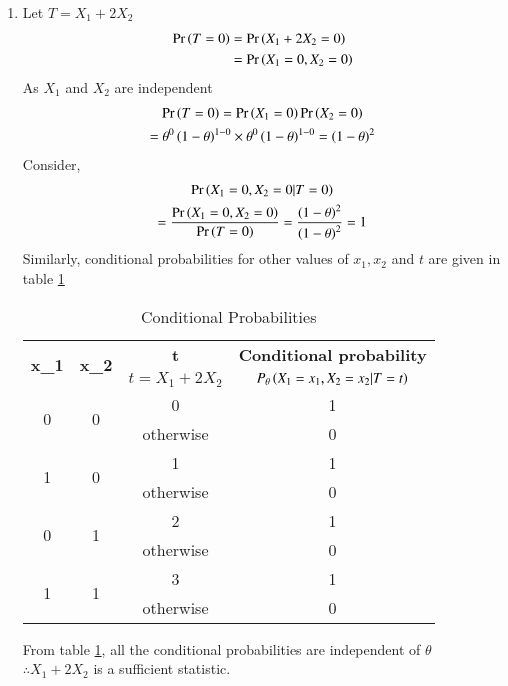 \documentclass[journal,12pt,twocolumn]{IEEEtran}
\begin{document}
\begin{enumerate}
    \item Let $T=X_1+2X_2$
    \begin{align}
    \Pr\left(T=0\right)&=\Pr\left(X_1+2X_2=0\right)\\
    &=\Pr\left(X_1=0,X_2=0\right)
    \end{align}
    As $X_1$ and $X_2$ are independent
    \begin{multline}
        \Pr\left(T=0\right)=\Pr\left(X_1=0\right)\Pr\left(X_2=0\right)\\
    =\theta^0 \left(1-\theta\right)^{1-0}\times\theta^0 \left(1-\theta\right)^{1-0}=\left(1-\theta\right)^2
    \end{multline}
    Consider,
    \begin{multline}
        \Pr\left(X_1=0,X_2=0 | T=0\right)\\=\frac{\Pr\left(X_1=0,X_2=0\right)}{\Pr\left(T=0\right)}
        =\frac{\left(1-\theta\right)^2}{\left(1-\theta\right)^2}=1
    \end{multline}
    Similarly, conditional probabilities for other values of $x_1,x_2$ and $t$ are given in table \ref{table1}
    \begin{table}[h!]
    \begin{tabular}[width=\columnwidth]{|c|c|c|c|}
         \hline
        \multirow{2}{*}{\textbf{x_1}} & \multirow{2}{*}{\textbf{x_2}} & \textbf{t} & \textbf{Conditional probability}  \\
        & & $t=X_1+2X_2$ & $P_\theta\left(X_1=x_1,X_2=x_2|T=t\right)$\\
        \hline
        \multirow{2}{*}{0} & \multirow{2}{*}{0} & 0 & 1\\ 
        & & otherwise & 0 \\ 
        \hline
        \multirow{2}{*}{1} & \multirow{2}{*}{0} & 1 & 1\\ 
        & & otherwise & 0 \\ 
        \hline
        \multirow{2}{*}{0} & \multirow{2}{*}{1} & 2 & 1\\ 
        & & otherwise & 0 \\ 
        \hline
        \multirow{2}{*}{1} & \multirow{2}{*}{1} & 3 & 1\\ 
        & & otherwise & 0 \\        
        \hline
    \end{tabular}
    \caption{Conditional Probabilities}
    \label{table1}
    \end{table}    
    
    From table \ref{table1}, all the conditional probabilities are independent of $\theta$\\ $\therefore X_1+2X_2$ is a sufficient statistic.
    

\end{enumerate}
\end{document}

